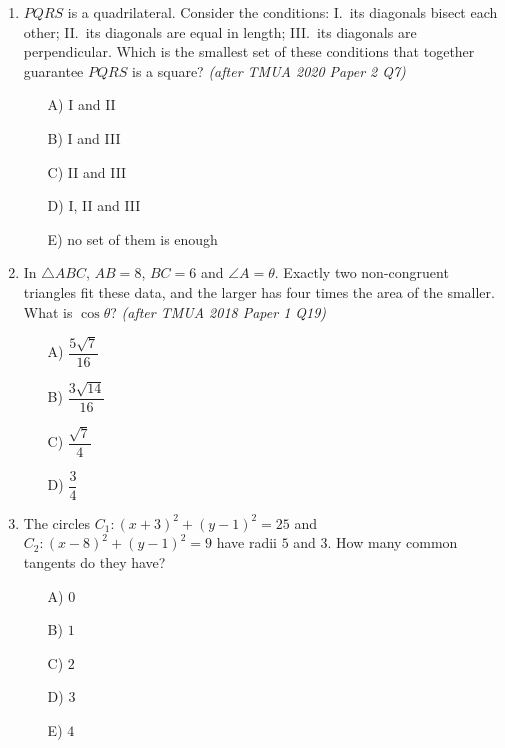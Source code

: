 \documentclass[11pt,a4paper]{article}
\begin{document}
\begin{enumerate}
\item $PQRS$ is a quadrilateral. Consider the conditions: I.\ its diagonals bisect each other; \quad II.\ its diagonals are equal in length; \quad III.\ its diagonals are perpendicular. Which is the smallest set of these conditions that together guarantee $PQRS$ is a square? \textit{\small(after TMUA 2020 Paper 2 Q7)}
\begin{itemize}
\item[A)] I and II
\item[B)] I and III
\item[C)] II and III
\item[D)] I, II and III
\item[E)] no set of them is enough
\end{itemize}

\item \begin{minipage}[t]{0.60\linewidth}
In $\triangle ABC$, $AB=8$, $BC=6$ and $\angle A=\theta$. Exactly two non-congruent triangles fit these data, and the larger has four times the area of the smaller. What is $\cos\theta$? \textit{\small(after TMUA 2018 Paper 1 Q19)}
\begin{itemize}[itemsep=4pt]
\item[A)] $\dfrac{5\sqrt7}{16}$
\item[B)] $\dfrac{3\sqrt{14}}{16}$
\item[C)] $\dfrac{\sqrt7}{4}$
\item[D)] $\dfrac34$
\end{itemize}
\end{minipage}\hfill
\begin{minipage}[t]{0.36\linewidth}
\vspace{0pt}
\centering
{}
\end{minipage}

\item The circles $C_1:(x+3)^2+(y-1)^2=25$ and $C_2:(x-8)^2+(y-1)^2=9$ have radii $5$ and $3$. How many common tangents do they have?
\begin{itemize}
\item[A)] $0$
\item[B)] $1$
\item[C)] $2$
\item[D)] $3$
\item[E)] $4$
\end{itemize}


\end{enumerate}
\end{document}
